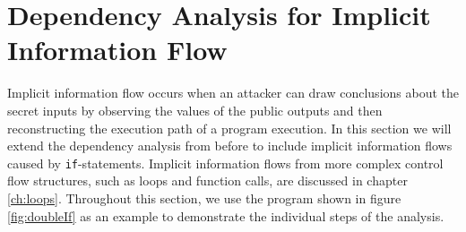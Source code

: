 \section{Dependency Analysis for Implicit Information Flow}
Implicit information flow occurs when an attacker can draw conclusions about the secret inputs by observing the values of the public outputs and then reconstructing the execution path of a program execution. In this section we will extend the dependency analysis from before to include implicit information flows caused by \texttt{if}-statements. Implicit information flows from more complex control flow structures, such as loops and function calls, are discussed in chapter \ref{ch:loops}. Throughout this section, we use the program shown in figure \ref{fig:doubleIf} as an example to demonstrate the individual steps of the analysis.

